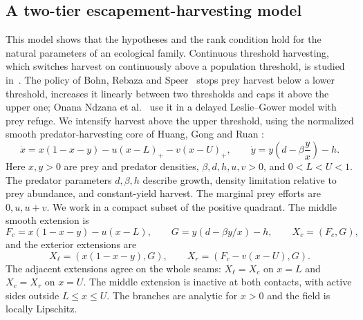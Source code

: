 \subsection{A two-tier escapement-harvesting model}
\label{sec:harvesting}

This model shows that the hypotheses and the rank condition hold for the
natural parameters of an ecological family. Continuous threshold harvesting,
which switches harvest on continuously above a population threshold, is
studied in~\cite{leardrebaza2011,rebaza2012}. The policy of Bohn, Rebaza and
Speer~\cite{bohn2011} stops prey harvest below a lower threshold, increases it
linearly between two thresholds and caps it above the upper one; Onana Ndzana
et al.~\cite{onana2019} use it in a delayed Leslie--Gower model with prey
refuge. We intensify harvest above the upper threshold, using the normalized
smooth
predator-harvesting core of Huang, Gong and Ruan
\cite[equation~(9) and Theorem~3.6]{huang2013}:
\begin{equation}\label{eq:harvesting:model}
 \dot x=x(1-x-y)-u(x-L)_+-v(x-U)_+,\qquad
 \dot y=y\left(d-\beta\frac yx\right)-h.
\end{equation}
Here \(x,y>0\) are prey and predator densities,
\(\beta,d,h,u,v>0\), and \(0<L<U<1\).
The predator parameters \(d,\beta,h\) describe growth, density limitation
relative to prey abundance, and constant-yield harvest.
The marginal prey efforts are \(0,u,u+v\). We work in a compact
subset of the positive quadrant. The middle smooth extension is
\begin{equation}\label{eq:harvesting:middle}
 F_c=x(1-x-y)-u(x-L),\qquad
 G=y(d-\beta y/x)-h,\qquad X_c=(F_c,G),
\end{equation}
and the exterior extensions are
\[
 X_\ell=(x(1-x-y),G),\qquad X_r=(F_c-v(x-U),G).
\]
The adjacent extensions agree on the whole seams:
\(X_\ell=X_c\) on \(x=L\) and \(X_c=X_r\) on \(x=U\).
The middle extension is
inactive at both contacts, with active sides outside \(L\le x\le U\).
The branches are analytic for \(x>0\) and the field is
locally Lipschitz.

